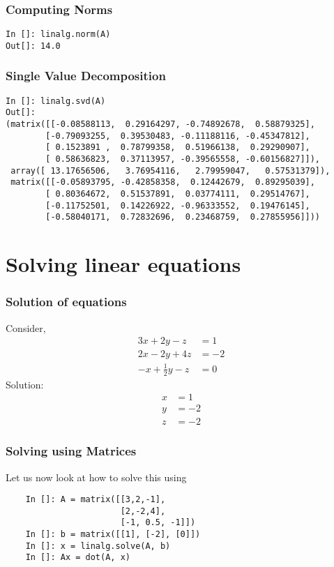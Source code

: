 \documentclass[14pt,compress]{beamer}
\newcommand{\kwrd}[1]{ \texttt{\textbf{\color{blue}{#1}}}  }
\begin{document}
\begin{frame}[fragile]
\frametitle{Computing Norms}
\begin{lstlisting}
In []: linalg.norm(A)
Out[]: 14.0
\end{lstlisting}
\end{frame}

\begin{frame}[fragile]
  \frametitle{Single Value Decomposition}
  \begin{small}
  \begin{lstlisting}
In []: linalg.svd(A)
Out[]: 
(matrix([[-0.08588113,  0.29164297, -0.74892678,  0.58879325],
        [-0.79093255,  0.39530483, -0.11188116, -0.45347812],
        [ 0.1523891 ,  0.78799358,  0.51966138,  0.29290907],
        [ 0.58636823,  0.37113957, -0.39565558, -0.60156827]]),
 array([ 13.17656506,   3.76954116,   2.79959047,   0.57531379]),
 matrix([[-0.05893795, -0.42858358,  0.12442679,  0.89295039],
        [ 0.80364672,  0.51537891,  0.03774111,  0.29514767],
        [-0.11752501,  0.14226922, -0.96333552,  0.19476145],
        [-0.58040171,  0.72832696,  0.23468759,  0.27855956]]))
\end{lstlisting}
  \end{small}
\end{frame}

\section{Solving linear equations}

\begin{frame}[fragile]
\frametitle{Solution of equations}
Consider,
  \begin{align*}
    3x + 2y - z  & = 1 \\
    2x - 2y + 4z  & = -2 \\
    -x + \frac{1}{2}y -z & = 0
  \end{align*}
Solution:
  \begin{align*}
    x & = 1 \\
    y & = -2 \\
    z & = -2
  \end{align*}
\end{frame}

\begin{frame}[fragile]
\frametitle{Solving using Matrices}
Let us now look at how to solve this using \kwrd{matrices}
  \begin{lstlisting}
    In []: A = matrix([[3,2,-1],
                       [2,-2,4],
                       [-1, 0.5, -1]])
    In []: b = matrix([[1], [-2], [0]])
    In []: x = linalg.solve(A, b)
    In []: Ax = dot(A, x)
  \end{lstlisting}
\end{frame}
\end{document}
